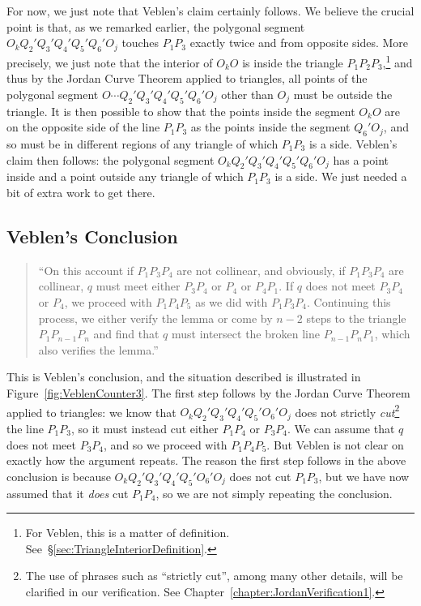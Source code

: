 For now, we just note that Veblen's claim certainly follows. We believe the crucial point is that, as we remarked earlier, the polygonal segment $O_kQ_2'Q_3'Q_4'Q_5'Q_6'O_j$ touches $P_1P_3$ exactly twice and from opposite sides. More precisely, we just note that the interior of $O_kO$ is inside the triangle $P_1P_2P_3$,\footnote{For Veblen, this is a matter of definition. See~\S\ref{sec:TriangleInteriorDefinition}.} and thus by the Jordan Curve Theorem applied to triangles, all points of the polygonal segment $O\cdots Q_2'Q_3'Q_4'Q_5'Q_6'O_j$ other than $O_j$ must be outside the triangle. It is then possible to show that the points inside the segment $O_kO$ are on the opposite side of the line $P_1P_3$ as the points inside the segment $Q_6'O_j$, and so must be in different regions of any triangle of which $P_1P_3$ is a side. Veblen's claim then follows: the polygonal segment $O_kQ_2'Q_3'Q_4'Q_5'Q_6'O_j$ has a point inside and a point outside any triangle of which $P_1P_3$ is a side. We just needed a bit of extra work to get there.

\subsection{Veblen's Conclusion}
\begin{quote}
``On this account if $P_1P_3P_4$ are not collinear, and obviously, if $P_1P_3P_4$ are collinear, $q$ must meet either $P_3P_4$ or $P_4$ or $P_4P_1$. If $q$ does not meet $P_3P_4$ or $P_4$, we proceed with $P_1P_4P_5$ as we did with $P_1P_3P_4$. Continuing this process, we either verify the lemma or come by $n-2$ steps to the triangle $P_1P_{n-1}P_n$ and find that $q$ must intersect the broken line $P_{n-1}P_nP_1$, which also verifies the lemma.''
\end{quote}

This is Veblen's conclusion, and the situation described is illustrated in Figure~\ref{fig:VeblenCounter3}. The first step follows by the Jordan Curve Theorem applied to triangles: we know that $O_kQ_2'Q_3'Q_4'Q_5'O_6'O_j$ does not strictly \emph{cut}\footnote{The use of phrases such as ``strictly cut'', among many other details, will be clarified in our verification. See Chapter~\ref{chapter:JordanVerification1}.} the line $P_1P_3$, so it must instead cut either $P_1P_4$ or $P_3P_4$. We can assume that $q$ does not meet $P_3P_4$, and so we proceed with $P_1P_4P_5$. But Veblen is not clear on exactly how the argument repeats. The reason the first step follows in the above conclusion is because $O_kQ_2'Q_3'Q_4'Q_5'O_6'O_j$ does not cut $P_1P_3$, but we have now assumed that it \emph{does} cut $P_1P_4$, so we are not simply repeating the conclusion. 

